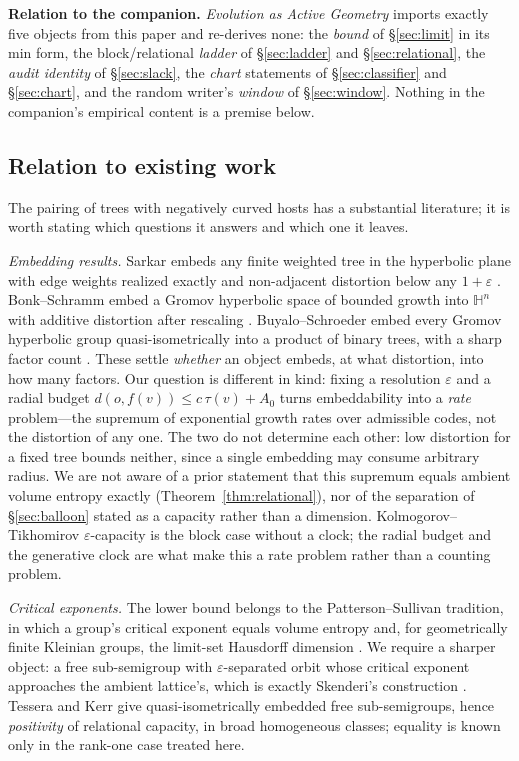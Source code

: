 \documentclass[11pt,reqno]{amsart}
\theoremstyle{plain}
\theoremstyle{definition}
\newcommand{\eps}{\varepsilon}
\begin{document}
\medskip
\noindent\textbf{Relation to the companion.} \emph{Evolution as Active Geometry} imports exactly five objects from this paper and re-derives none: the \emph{bound} of \S\ref{sec:limit} in its min form, the block/relational \emph{ladder} of \S\ref{sec:ladder} and \S\ref{sec:relational}, the \emph{audit identity} of \S\ref{sec:slack}, the \emph{chart} statements of \S\ref{sec:classifier} and \S\ref{sec:chart}, and the random writer's \emph{window} of \S\ref{sec:window}. Nothing in the companion's empirical content is a premise below.

\subsection{Relation to existing work}\label{sec:related}

The pairing of trees with negatively curved hosts has a substantial literature; it is worth stating which questions it answers and which one it leaves.

\emph{Embedding results.} Sarkar embeds any finite weighted tree in the hyperbolic plane with edge weights realized exactly and non-adjacent distortion below any $1+\eps$ \cite{sarkar2011}. Bonk--Schramm embed a Gromov hyperbolic space of bounded growth into $\mathbb H^n$ with additive distortion after rescaling \cite{bonkschramm2000}. Buyalo--Schroeder embed every Gromov hyperbolic group quasi-isometrically into a product of binary trees, with a sharp factor count \cite{buyaloschroeder2005,buyaloschroeder2007}. These settle \emph{whether} an object embeds, at what distortion, into how many factors. Our question is different in kind: fixing a resolution $\eps$ and a radial budget $d(o,f(v))\le c\,\tau(v)+A_0$ turns embeddability into a \emph{rate} problem---the supremum of exponential growth rates over admissible codes, not the distortion of any one. The two do not determine each other: low distortion for a fixed tree bounds neither, since a single embedding may consume arbitrary radius. We are not aware of a prior statement that this supremum equals ambient volume entropy exactly (Theorem~\ref{thm:relational}), nor of the separation of \S\ref{sec:balloon} stated as a capacity rather than a dimension. Kolmogorov--Tikhomirov $\eps$-capacity is the block case without a clock; the radial budget and the generative clock are what make this a rate problem rather than a counting problem.

\emph{Critical exponents.} The lower bound belongs to the Patterson--Sullivan tradition, in which a group's critical exponent equals volume entropy and, for geometrically finite Kleinian groups, the limit-set Hausdorff dimension \cite{patterson1976,sullivan1979,bishopjones1997}. We require a sharper object: a free sub-semigroup with $\eps$-separated orbit whose critical exponent approaches the ambient lattice's, which is exactly Skenderi's construction \cite{skenderi2026}. Tessera \cite{tessera2008} and Kerr \cite{kerr2022} give quasi-isometrically embedded free sub-semigroups, hence \emph{positivity} of relational capacity, in broad homogeneous classes; equality is known only in the rank-one case treated here.
\end{document}
